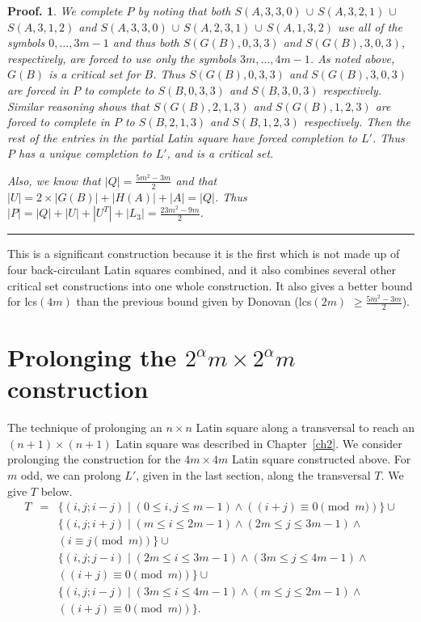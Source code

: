 \documentclass[12pt]{report}
\newtheorem{preproof}{{\bf Proof.}}
\newenvironment{proof}[1]{\begin{preproof}{\rm
               #1}\hfill{\rule[-0.5mm]{2mm}{2mm}}}{\end{preproof}}
\def\lcs#1{{\rm lcs}$(#1)$}
\begin{document}
\begin{proof}
{We complete $P$ by noting that both $S(A,3,3,0)$ $\cup$ $S(A,3,2,1)$
$\cup$ \break $S(A,3,1,2)$ and $S(A,3,3,0)$ $\cup$ $S(A,2,3,1)$ $\cup$ $S(A,1,3,2)$
use all of the symbols $0, \dots, 3m-1$ and thus both $S(G(B),0,3,3)$
and $S(G(B),3,0,3)$, respectively, are forced to use only the symbols
$3m, \dots, 4m-1$. As noted above, $G(B)$ is a critical set for $B$.
Thus $S(G(B),0,3,3)$ and $S(G(B),3,0,3)$ are
forced in $P$ to complete to $S(B,0,3,3)$ and $S(B,3,0,3)$ respectively.
Similar reasoning shows that $S(G(B),2,1,3)$ and $S(G(B),1,2,3)$ are
forced to complete in $P$ to $S(B,2,1,3)$ and $S(B,1,2,3)$ respectively.
Then the rest of the entries in the partial Latin square have forced completion
to $L'$.  Thus $P$ has a unique completion to $L'$, and is a critical set.

Also, we know that $|Q| = \displaystyle{\frac{5m^2-3m}{2}}$ and that
$|U| = 2 \times |G(B)| + |H(A)| + |A| = |Q|$.  Thus
$|P| = |Q| + |U| + |U^T| + |L_3| = \displaystyle{\frac{23m^2-9m}{2}}$.
} 
\end{proof}

This is a significant construction because it is the first which is not
made up of four back-circulant Latin squares combined, and it also
combines several other critical set constructions into one whole construction.
It also gives a better bound for \lcs{4m} than the previous bound given by Donovan \cite{MR99a:05018}
(\lcs{2m} $\geq \displaystyle{\frac{5m^2-3m}{2}}$).

\section{Prolonging the $2^\alpha m \times 2^\alpha m$ construction}

The technique of prolonging an $n \times n$ Latin square along a
transversal to reach an $(n+1) \times (n+1)$ Latin square was described
in Chapter~\ref{ch2}.  We consider prolonging the construction for the $4m \times
4m$ Latin square constructed above.  For $m$ odd, we can prolong $L'$,
given in the last section, along the transversal $T$.  We give $T$ below.
\begin{eqnarray*}
T & = & \{ (i, j; i-j) \mid (0 \leq i,j \leq m-1) \wedge ((i + j) \equiv 0\pmod{m}) \} \cup \\
 && \{ (i, j; i+j) \mid (m \leq i \leq 2m-1) \wedge (2m \leq j \leq 3m-1) \wedge \\
&& (i \equiv j\pmod{m} ) \} \cup \\
 && \{ (i, j; j-i) \mid (2m \leq i \leq 3m-1) \wedge (3m \leq j \leq 4m-1) \wedge \\
&& ((i + j) \equiv  0\pmod{m}) \} \cup \\
&& \{ (i,j ; i-j) \mid (3m \leq i \leq 4m-1) \wedge (m \leq j \leq 2m-1) \wedge \\
&& ((i+j) \equiv 0\pmod{m} ) \}.
\end{eqnarray*}
\end{document}
